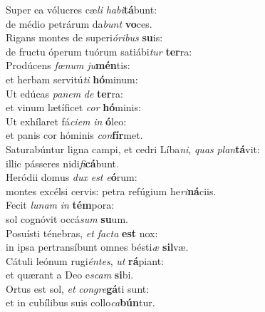 \oddverse Super ea vólucres cæ\textit{li} \textit{ha}\textit{bi}\textbf{tá}bunt:~\*\\
\oddverse de médio petrárum da\textit{bunt} \textbf{vo}ces.\\
\evenverse Rigans montes de superi\textit{ó}\textit{ri}\textit{bus} \textbf{su}is:~\*\\
\evenverse de fructu óperum tuórum satiábi\textit{tur} \textbf{ter}ra:\\
\oddverse Prodúcens \textit{fœ}\textit{num} \textit{ju}\textbf{mén}tis:~\*\\
\oddverse et herbam servitú\textit{ti} \textbf{hó}minum:\\
\evenverse Ut edúcas \textit{pa}\textit{nem} \textit{de} \textbf{ter}ra:~\*\\
\evenverse et vinum lætíficet \textit{cor} \textbf{hó}minis:\\
\oddverse Ut exhílaret fá\textit{ci}\textit{em} \textit{in} \textbf{ó}leo:~\*\\
\oddverse et panis cor hóminis \textit{con}\textbf{fír}met.\\
\evenverse Saturabúntur ligna campi, et cedri Líba\textit{ni}, \textit{quas} \textit{plan}\textbf{tá}vit:~\*\\
\evenverse illic pásseres nidi\textit{fi}\textbf{cá}bunt.\\
\oddverse Heródii domus \textit{dux} \textit{est} \textit{e}\textbf{ó}rum:~\*\\
\oddverse montes excélsi cervis: petra refúgium he\textit{ri}\textbf{ná}ciis.\\
\evenverse Fecit \textit{lu}\textit{nam} \textit{in} \textbf{tém}pora:~\*\\
\evenverse sol cognóvit occá\textit{sum} \textbf{su}um.\\
\oddverse Posuísti ténebras, \textit{et} \textit{fa}\textit{cta} \textbf{est} nox:~\*\\
\oddverse in ipsa pertransíbunt omnes bésti\textit{æ} \textbf{sil}væ.\\
\evenverse Cátuli leónum rugi\textit{én}\textit{tes}, \textit{ut} \textbf{rá}piant:~\*\\
\evenverse et quærant a Deo e\textit{scam} \textbf{si}bi.\\
\oddverse Ortus est sol, \textit{et} \textit{con}\textit{gre}\textbf{gá}ti sunt:~\*\\
\oddverse et in cubílibus suis collo\textit{ca}\textbf{bún}tur.\\
